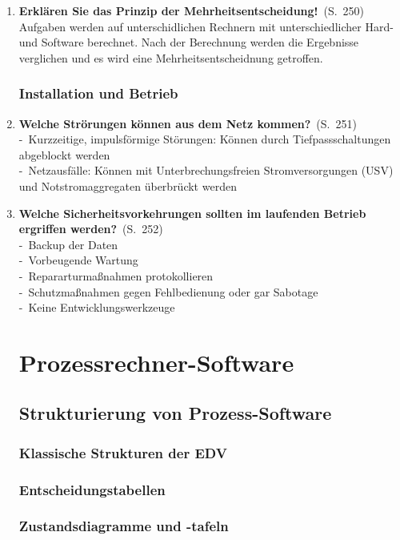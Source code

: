 \documentclass[a4paper,12pt]{article}
\newcommand{\question}[3]{\pagebreak[3]\item {\textbf{#1?}}\ (S.\ #2)#3}
\newcommand{\statement}[3]{\pagebreak[3]\item {\textbf{#1!}}\ (S.\ #2)#3}
\newcommand{\catchword}[1]{\\-\ #1}
\newcommand{\normaltext}[1]{\\#1}
\newcommand{\page}[1]{#1}
\begin{document}
\begin{enumerate}
  \statement{Erklären Sie das Prinzip der Mehrheitsentscheidung}{\page{250}}
  {
    \normaltext{Aufgaben werden auf unterschidlichen Rechnern mit unterschiedlicher Hard-
                und Software berechnet. Nach der Berechnung werden die Ergebnisse verglichen
                und es wird eine Mehrheitsentscheidnung getroffen.}
  }

  \subsubsection{Installation und Betrieb}

  \question{Welche Strörungen können aus dem Netz kommen}{\page{251}}
  {
    \catchword{Kurzzeitige, impulsförmige Störungen: Können durch Tiefpassschaltungen
               abgeblockt werden}
    \catchword{Netzausfälle: Können mit Unterbrechungsfreien Stromversorgungen (USV) und
               Notstromaggregaten überbrückt werden}
  }

  \question{Welche Sicherheitsvorkehrungen sollten im laufenden Betrieb ergriffen werden}{\page{252}}
  {
    \catchword{Backup der Daten}
    \catchword{Vorbeugende Wartung}
    \catchword{Repararturmaßnahmen protokollieren}
    \catchword{Schutzmaßnahmen gegen Fehlbedienung oder gar Sabotage}
    \catchword{Keine Entwicklungswerkzeuge}
  }

  \newpage
  \section{Prozessrechner-Software}

  \subsection{Strukturierung von Prozess-Software}

  \subsubsection{Klassische Strukturen der EDV}

  \subsubsection{Entscheidungstabellen}

  \subsubsection{Zustandsdiagramme und -tafeln}


\end{enumerate}
\end{document}
